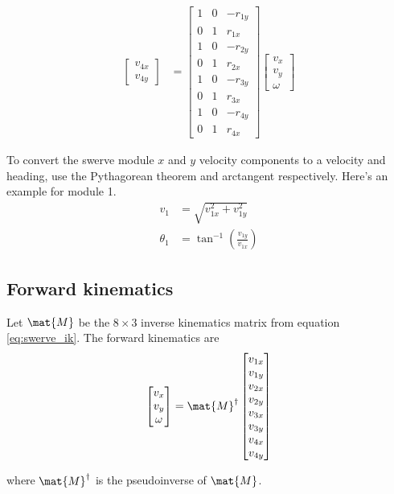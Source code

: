 \begin{align}
\begin{bmatrix}
    v_{4x} \\
    v_{4y}
  \end{bmatrix} &=
  \begin{bmatrix}
    1 & 0 & -r_{1y} \\
    0 & 1 &  r_{1x} \\
    1 & 0 & -r_{2y} \\
    0 & 1 &  r_{2x} \\
    1 & 0 & -r_{3y} \\
    0 & 1 &  r_{3x} \\
    1 & 0 & -r_{4y} \\
    0 & 1 &  r_{4x}
  \end{bmatrix}
  \begin{bmatrix}
    v_x \\
    v_y \\
    \omega
  \end{bmatrix}
\end{align}

To convert the swerve module $x$ and $y$ velocity components to a velocity and
heading, use the Pythagorean theorem and arctangent respectively. Here's an
example for module 1.
\begin{align}
  v_1 &= \sqrt{v_{1x}^2 + v_{1y}^2} \\
  \theta_1 &= \tan^{-1}\left(\frac{v_{1y}}{v_{1x}}\right)
\end{align}

\subsection{Forward kinematics}

Let $\mat{M}$ be the $8 \times 3$ inverse kinematics matrix from equation
\eqref{eq:swerve_ik}. The forward kinematics are
\begin{equation}
  \begin{bmatrix}
    v_x \\
    v_y \\
    \omega
  \end{bmatrix} =
  \mat{M}^\dagger
  \begin{bmatrix}
    v_{1x} \\
    v_{1y} \\
    v_{2x} \\
    v_{2y} \\
    v_{3x} \\
    v_{3y} \\
    v_{4x} \\
    v_{4y}
  \end{bmatrix}
\end{equation}

where $\mat{M}^\dagger$ is the pseudoinverse of $\mat{M}$.
